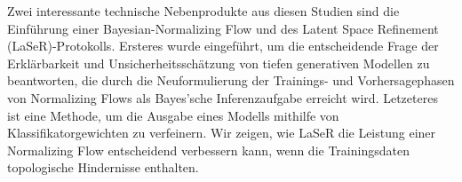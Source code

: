 Zwei interessante technische Nebenprodukte aus diesen Studien sind die Einführung einer Bayesian-Normalizing Flow und des Latent Space Refinement (LaSeR)-Protokolls. Ersteres wurde eingeführt, um die entscheidende Frage der Erklärbarkeit und Unsicherheitsschätzung von tiefen generativen Modellen zu beantworten, die durch die Neuformulierung der Trainings- und Vorhersagephasen von Normalizing Flows als Bayes'sche Inferenzaufgabe erreicht wird. Letzeteres ist eine Methode, um die Ausgabe eines Modells mithilfe von Klassifikatorgewichten zu verfeinern. Wir zeigen, wie LaSeR die Leistung einer Normalizing Flow entscheidend verbessern kann, wenn die Trainingsdaten topologische Hindernisse enthalten.

%

